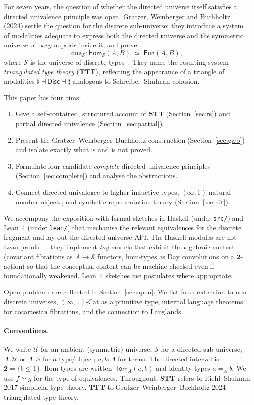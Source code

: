 \documentclass[12pt]{article}
\theoremstyle{definition}
\theoremstyle{remark}
\newcommand{\U}{\mathcal{U}}
\newcommand{\Hom}{\mathsf{Hom}}
\newcommand{\Fun}{\mathsf{Fun}}
\newcommand{\dua}{\mathsf{dua}}
\newcommand{\eqv}{\simeq}
\newcommand{\Disc}{\mathsf{Disc}}
\newcommand{\STT}{\mathbf{STT}}
\newcommand{\TTT}{\mathbf{TTT}}
\newcommand{\twoI}{\mathbf{2}}
\begin{document}
For seven years, the question of whether the directed universe itself satisfies a directed univalence principle was open. Gratzer, Weinberger and Buchholtz (2024) settle the question for the discrete sub-universe: they introduce a system of modalities adequate to express both the directed universe and the symmetric universe of $\infty$-groupoids inside it, and prove
\[
\dua_{\mathcal{S}} : \Hom_{\mathcal{S}}(A,B) \;\eqv\; \Fun(A,B),
\]
where $\mathcal{S}$ is the universe of discrete types~\cite{GWB2024}. They name the resulting system \emph{triangulated type theory} ($\TTT$), reflecting the appearance of a triangle of modalities $\flat \dashv \Disc \dashv \sharp$ analogous to Schreiber--Shulman cohesion.

This paper has four aims:
\begin{enumerate}
\item Give a self-contained, structured account of $\STT$ (Section~\ref{sec:rs}) and partial directed univalence (Section~\ref{sec:partial}).
\item Present the Gratzer--Weinberger--Buchholtz construction (Section~\ref{sec:gwb}) and isolate exactly what is and is not proved.
\item Formulate four candidate \emph{complete} directed univalence principles (Section~\ref{sec:complete}) and analyse the obstructions.
\item Connect directed univalence to higher inductive types, $(\infty,1)$-natural number objects, and synthetic representation theory (Section~\ref{sec:hit}).
\end{enumerate}

We accompany the exposition with formal sketches in Haskell (under \texttt{src/}) and Lean~4 (under \texttt{lean/}) that mechanise the relevant equivalences for the discrete fragment and lay out the directed universe API\@. The Haskell modules are not Lean proofs --- they implement \emph{toy} models that exhibit the algebraic content (covariant fibrations as $A \to \mathcal{S}$ functors, hom-types as Day convolutions on a $\twoI$-action) so that the conceptual content can be machine-checked even if foundationally weakened. Lean~4 sketches use postulates where appropriate.

Open problems are collected in Section~\ref{sec:open}. We list four: extension to non-discrete universes, $(\infty,1)$-Cat as a primitive type, internal language theorems for cocartesian fibrations, and the connection to Langlands.

\paragraph{Conventions.} We write $\U$ for an ambient (symmetric) universe; $\mathcal{S}$ for a directed sub-universe; $A : \U$ or $A : \mathcal{S}$ for a type/object; $a, b : A$ for terms. The directed interval is $\twoI = \{0 \le 1\}$. Hom-types are written $\Hom_A(a,b)$ and identity types $a =_A b$. We use $f \eqv g$ for the type of equivalences. Throughout, $\STT$ refers to Riehl--Shulman 2017 simplicial type theory, $\TTT$ to Gratzer--Weinberger--Buchholtz 2024 triangulated type theory.
\end{document}
